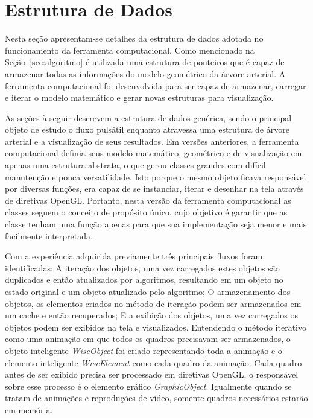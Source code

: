 \documentclass[
        english,			
        brazil			        %
        ,<...>]{abntbibufjf}
\begin{document}
\section{Estrutura de Dados}\label{sec:estrutura}

Nesta seção apresentam-se detalhes da estrutura de dados adotada no funcionamento da ferramenta computacional. Como mencionado na Seção~\ref{sec:algoritmo} é utilizada uma estrutura de ponteiros que é capaz de armazenar todas as informações do modelo geométrico da árvore arterial. A ferramenta computacional foi desenvolvida para ser capaz de armazenar, carregar e iterar o modelo matemático e gerar novas estruturas para visualização.

As seções à seguir descrevem a estrutura de dados genérica, sendo o principal objeto de estudo o fluxo pulsátil enquanto atravessa uma estrutura de árvore arterial e a visualização de seus resultados. Em versões anteriores, a ferramenta computacional  definia seus modelo matemático, geométrico e de visualização em apenas uma estrutura abstrata, o que gerou classes grandes com difícil manutenção e pouca versatilidade. Isto porque o mesmo objeto ficava responsável por diversas funções, era capaz de se instanciar, iterar e desenhar na tela através de diretivas OpenGL. Portanto, nesta versão da ferramenta computacional as classes seguem o conceito de propósito único, cujo objetivo é garantir que as classe tenham uma função apenas para que sua implementação seja menor e mais facilmente interpretada.

Com a experiência adquirida previamente três principais fluxos foram identificadas:  A iteração dos objetos, uma vez carregados estes objetos são duplicados e então atualizados por algoritmos, resultando em um objeto no estado original e um objeto atualizado pelo algoritmo; O armazenamento dos objetos, os elementos criados no método de iteração podem ser armazenados em um cache e então recuperados;  E a exibição dos objetos, uma vez carregados os objetos podem ser exibidos na tela e visualizados. Entendendo o método iterativo como uma animação em que todos os quadros precisavam ser armazenados, o objeto inteligente \textit{WiseObject} foi criado representando toda a animação e o elemento inteligente \textit{WiseElement} como cada quadro da animação. Cada quadro antes de ser exibido precisa ser processado em diretivas OpenGL, o responsável sobre esse processo é o elemento gráfico \textit{GraphicObject}. Igualmente quando se tratam de animações e reproduções de vídeo, somente quadros necessários estarão em memória. 
\end{document}
